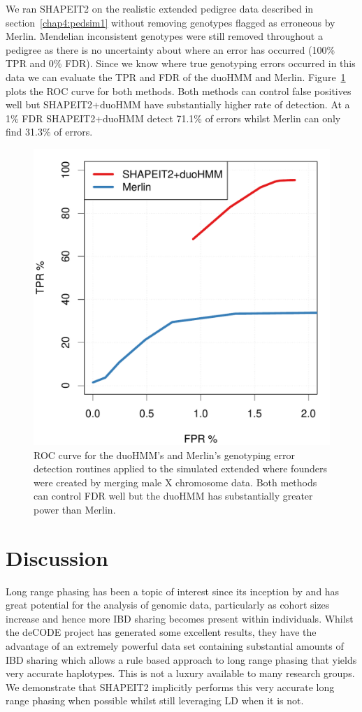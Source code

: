 We ran SHAPEIT2 on the realistic extended pedigree data described in section~\ref{chap4:pedsim1} without removing genotypes flagged as erroneous by Merlin. Mendelian inconsistent genotypes were still removed throughout a pedigree as there is no uncertainty about where an error has occurred (100\% TPR and 0\% FDR).  Since we know where true genotyping errors occurred in this data we can evaluate the TPR and FDR of the duoHMM and Merlin. Figure~\ref{generr-roc} plots the ROC curve for both methods.  Both methods can control false positives well but SHAPEIT2+duoHMM have substantially higher rate of detection.  At a 1\% FDR SHAPEIT2+duoHMM detect 71.1\% of errors whilst Merlin can only find 31.3\% of errors.  %


\begin{figure}
\centering
   \includegraphics[width=.45\textwidth]{chap4figs/error_detection}%
\caption[ROC curve for the DuoHMM and Merlin genotyping error detection]{ROC curve for the duoHMM's and Merlin's genotyping error detection routines applied to the simulated extended where founders were created by merging male X chromosome data.  Both methods can control FDR well but the duoHMM has substantially greater power than Merlin.\label{generr-roc}}
\end{figure}

\clearpage
\section{Discussion}

Long range phasing has been a topic of interest since its inception by \cite{kong2008detection} and has great potential for the analysis of genomic data, particularly as cohort sizes increase and hence more IBD sharing becomes present within individuals.  Whilst the deCODE project has generated some excellent results, they have the advantage of an extremely powerful data set containing substantial amounts of IBD sharing which allows a rule based approach to long range phasing that yields very accurate haplotypes.  This is not a luxury available to many research groups. We demonstrate that SHAPEIT2 implicitly performs this very accurate long range phasing when possible whilst still leveraging LD when it is not.

